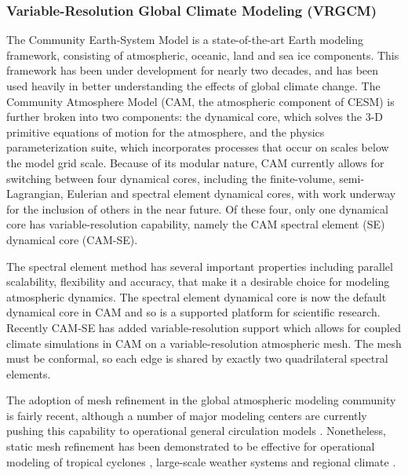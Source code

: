 \documentclass[11pt]{article}
\begin{document}
\subsubsection{Variable-Resolution Global Climate Modeling (VRGCM)}

The Community Earth-System Model \citep{hurrell2013community} is a state-of-the-art Earth modeling framework, consisting of atmospheric, oceanic, land and sea ice components. This framework has been under development for nearly two decades, and has been used heavily in better understanding the effects of global climate change. The Community Atmosphere Model (CAM, the atmospheric component of CESM) is further broken into two components: the dynamical core, which solves the 3-D primitive equations of motion for the atmosphere, and the physics parameterization suite, which incorporates processes that occur on scales below the model grid scale. Because of its modular nature, CAM currently allows for switching between four dynamical cores, including the finite-volume, semi-Lagrangian, Eulerian and spectral element dynamical cores, with work underway for the inclusion of others in the near future. Of these four, only one dynamical core has variable-resolution capability, namely the CAM spectral element (SE) dynamical core (CAM-SE).

The spectral element method has several important properties including parallel scalability, flexibility and accuracy, that make it a desirable choice for modeling atmospheric dynamics.  The spectral element dynamical core \citep{fournier2004spectral, taylor2010compatible} is now the default dynamical core in CAM and so is a supported platform for scientific research. Recently CAM-SE has added variable-resolution support which allows for coupled climate simulations in CAM on a variable-resolution atmospheric mesh. The mesh must be conformal, so each edge is shared by exactly two quadrilateral spectral elements. 

The adoption of mesh refinement in the global atmospheric modeling community is fairly recent, although a number of major modeling centers are currently pushing this capability to operational general circulation models \citep{skamarock2012mpas, LMHSJL2013MWR, CMZCJMAT2013MWR, mccorquodale2014adaptive}.   Nonetheless, static mesh refinement has been demonstrated to be effective for operational modeling of tropical cyclones \citep{zarzycki2014multidecadal, zarzycki2014using}, large-scale weather systems \citep{rauscher2014impact} and regional climate \citep{rauscher2013exploring, zarzycki2014aquaplanet}.
\end{document}
